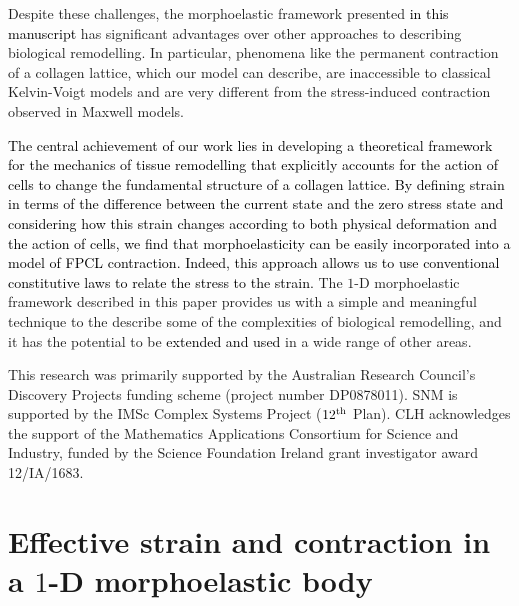 Despite these challenges, the morphoelastic framework presented \textcolor{black}{in this manuscript} has significant advantages over other approaches to describing biological remodelling. In particular, phenomena like the permanent contraction of a collagen lattice, which our model can describe, are inaccessible to classical Kelvin-Voigt models and are very different from the stress-induced contraction observed in Maxwell models.

\textcolor{black}{The central achievement of our work lies in developing a theoretical framework for the mechanics of tissue remodelling that explicitly accounts for the action of cells to change the fundamental structure of a collagen lattice. By defining strain in terms of the difference between the current state and the zero stress state and considering how this strain changes according to both physical deformation and the action of cells, we find that morphoelasticity can be easily incorporated into a model of FPCL contraction. Indeed, this approach allows us to use conventional constitutive laws to relate the stress to the strain.} The $1$-D morphoelastic framework described in this paper provides us with a simple and meaningful technique to the describe some of the complexities of biological remodelling, and it has the potential to be \textcolor{black}{extended and used} in a wide range of other areas.

\begin{acknowledgements}
This research was primarily supported by the Australian Research Council's Discovery Projects funding scheme (project number DP0878011). SNM is supported by the IMSc Complex Systems Project ($12^{\rm th}$ Plan).
CLH acknowledges the support of the Mathematics Applications Consortium for Science and Industry, funded by the Science Foundation Ireland grant investigator award 12/IA/1683.

\end{acknowledgements}

\appendix

\section{Effective strain and contraction in a $1$-D morphoelastic body}
\label{S:Theory}

